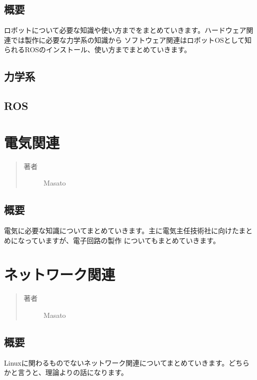 \documentclass[letterpaper,10pt,dvipdfmx]{sphinxmanual}
\begin{document}
\section{概要}
\label{learned_robot:id2}
ロボットについて必要な知識や使い方までをまとめていきます。ハードウェア関連では製作に必要な力学系の知識から
ソフトウェア関連はロボットOSとして知られるROSのインストール、使い方までまとめていきます。


\section{力学系}
\label{learned_robot:id3}

\section{ROS}
\label{learned_robot:ros}

\chapter{電気関連}
\label{learned_electric:id1}\label{learned_electric::doc}\begin{quote}\begin{description}
\item[{著者}] \leavevmode
Masato

\end{description}\end{quote}


\section{概要}
\label{learned_electric:id2}
電気に必要な知識についてまとめていきます。主に電気主任技術社に向けたまとめになっていますが、電子回路の製作
についてもまとめていきます。


\chapter{ネットワーク関連}
\label{learned_network:id1}\label{learned_network::doc}\begin{quote}\begin{description}
\item[{著者}] \leavevmode
Masato

\end{description}\end{quote}


\section{概要}
\label{learned_network:id2}
Linuxに関わるものでないネットワーク関連についてまとめていきます。どちらかと言うと、理論よりの話になります。
\end{document}
